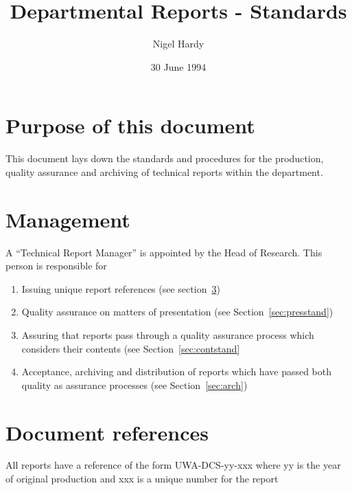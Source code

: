 \documentclass[a4paper, 12pt]{article}
\title {Departmental Reports - Standards}
\author {Nigel Hardy}
\date{30 June 1994} %
\begin{document}
\maketitle
\begin{multicols}{2}
\section{Purpose of this document}

This document lays down the standards and procedures
for the production, quality assurance and archiving of
technical reports within the department.


\section{Management}

A “Technical Report Manager” is appointed by
the Head of Research. This person is responsible
for
\begin{enumerate}  

\item Issuing unique report references (see section~\ref{sec:docrefs})
\item Quality assurance on matters of presentation (see Section~\ref{sec:presstand})
\item Assuring that reports pass through a quality assurance process which considers their contents (see Section~\ref{sec:contstand}
\item Acceptance, archiving and distribution of reports which have passed both quality as assurance processes (see Section~\ref{sec:arch})
\end{enumerate}

\section{Document references}
\label{sec:docrefs}

All reports have a reference of the form
\hspace{1cm}UWA-DCS-yy-xxx
\newline
where yy is the year of original production and xxx is a unique number for the report


\end{multicols}
\end{document}

